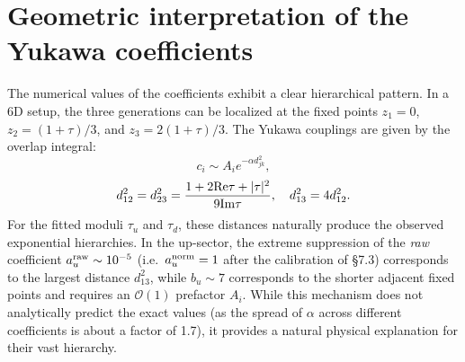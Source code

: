 \documentclass[12pt,a4paper]{article}
\numberwithin{equation}{section}
\begin{document}
\section{Geometric interpretation of the Yukawa coefficients}
The numerical values of the coefficients exhibit a clear hierarchical pattern. In a 6D setup, the three generations can be localized at the fixed points \(z_1 = 0\), \(z_2 = (1 + \tau)/3\), and \(z_3 = 2(1 + \tau)/3\). The Yukawa couplings are given by the overlap integral:
\begin{equation}
c_i\sim A_i e^{-\alpha d_{jk}^2},
\end{equation}
\begin{equation}
d_{12}^2 = d_{23}^2 = \frac{1 + 2{\rm Re}\tau + |\tau|^2}{9{\rm Im}\tau}, \quad d_{13}^2 = 4d_{12}^2.
\end{equation}
For the fitted moduli \(\tau_u\) and \(\tau_d\), these distances naturally produce the observed exponential hierarchies. In the up-sector, the extreme suppression of the \emph{raw} coefficient \(a_u^{\rm raw}\sim 10^{-5}\) (i.e.\ \(a_u^{\rm norm}=1\) after the calibration of \S7.3) corresponds to the largest distance \(d_{13}^2\), while \(b_u\sim 7\) corresponds to the shorter adjacent fixed points and requires an \(\mathcal{O}(1)\) prefactor \(A_i\). While this mechanism does not analytically predict the exact values (as the spread of \(\alpha\) across different coefficients is about a factor of 1.7), it provides a natural physical explanation for their vast hierarchy.
\end{document}
